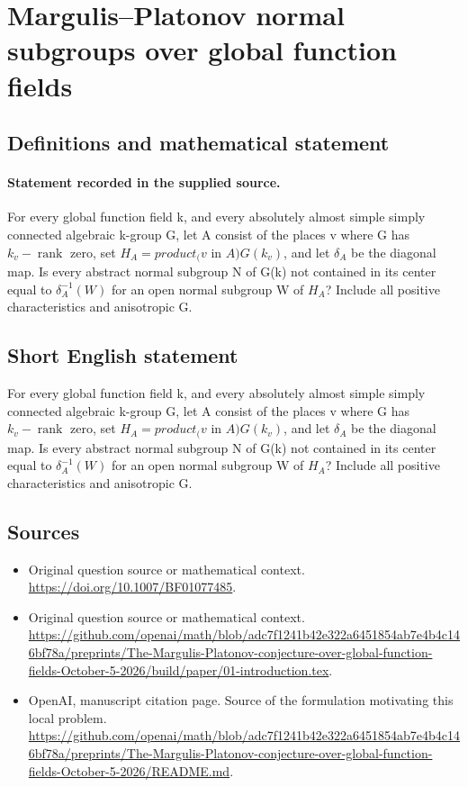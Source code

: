 \documentclass[11pt]{article}
\begin{document}
\section*{Margulis–Platonov normal subgroups over global function fields}\label{statement}
\subsection{Definitions and mathematical statement}
\paragraph{Statement recorded in the supplied source.}
For every global function field k, and every absolutely almost simple simply connected algebraic k-group G, let A consist of the places v where G has $k_v-\operatorname{rank}$ zero, set $H_A=product_(v$ in $A)G(k_v)$, and let $\delta _A$ be the diagonal map. Is every abstract normal subgroup N of G(k) not contained in its center equal to $\delta _A^{-1}(W)$ for an open normal subgroup W of $H_A$? Include all positive characteristics and anisotropic G.
\subsection{Short English statement}
For every global function field k, and every absolutely almost simple simply connected algebraic k-group G, let A consist of the places v where G has $k_v-\operatorname{rank}$ zero, set $H_A=product_(v$ in $A)G(k_v)$, and let $\delta _A$ be the diagonal map. Is every abstract normal subgroup N of G(k) not contained in its center equal to $\delta _A^{-1}(W)$ for an open normal subgroup W of $H_A$? Include all positive characteristics and anisotropic G.
\subsection{Sources}
\begin{itemize}
\item[S1] Original question source or mathematical context.
\url{https://doi.org/10.1007/BF01077485}.
\item[S2] Original question source or mathematical context.
\url{https://github.com/openai/math/blob/adc7f1241b42e322a6451854ab7e4b4c146bf78a/preprints/The-Margulis-Platonov-conjecture-over-global-function-fields-October-5-2026/build/paper/01-introduction.tex}.
\item[S3] OpenAI, manuscript citation page. Source of the formulation motivating this local problem.
\url{https://github.com/openai/math/blob/adc7f1241b42e322a6451854ab7e4b4c146bf78a/preprints/The-Margulis-Platonov-conjecture-over-global-function-fields-October-5-2026/README.md}.
\end{itemize}
\end{document}
